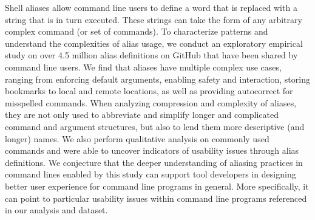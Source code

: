 
Shell aliases allow command line users to define a word that is replaced with a string that is in turn executed.
These strings can take the form of any arbitrary complex command (or set of commands).
To characterize patterns and understand the complexities of alias usage, we conduct an exploratory empirical study on over 4.5 million alias definitions on GitHub that have been shared by command line users.
We find that aliases have multiple complex use cases, ranging from enforcing default arguments, enabling safety and interaction, storing bookmarks to local and remote locations, as well as providing autocorrect for misspelled commands.
When analyzing compression and complexity of aliases, they are not only used to abbreviate and simplify longer and complicated command and argument structures, but also to lend them more descriptive (and longer) names.
We also perform qualitative analysis on commonly used commands and were able to uncover indicators of usability issues through alias definitions.
We conjecture that the deeper understanding of aliasing practices in command lines enabled by this study can support tool developers in designing better user experience for command line programs in general.
More specifically, it can point to particular usability issues within command line programs referenced in our analysis and dataset.